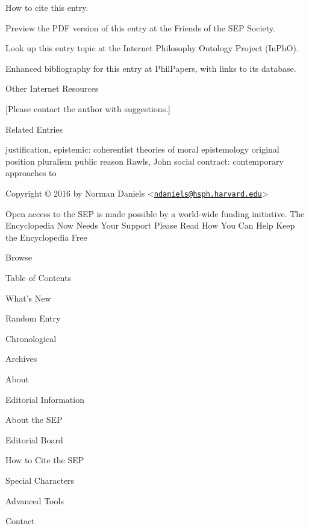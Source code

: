 \documentclass[]{article}
\begin{document}
How to cite this entry.

Preview the PDF version of this entry at the Friends of the SEP Society.

Look up this entry topic at the Internet Philosophy Ontology Project
(InPhO).

Enhanced bibliography for this entry at PhilPapers, with links to its
database.

\hypertarget{other-internet-resources}{}
\protect\hypertarget{Oth}{}{Other Internet Resources}

{[}Please contact the author with suggestions.{]}

\hypertarget{related-entries}{}
\protect\hypertarget{Rel}{}{Related Entries}

justification, epistemic: coherentist theories of \textbar{} moral
epistemology \textbar{} original position \textbar{} pluralism
\textbar{} public reason \textbar{} Rawls, John \textbar{} social
contract: contemporary approaches to

\hypertarget{article-copyright}{}
Copyright © 2016 by Norman Daniels
\textless{}\href{mailto:ndaniels@hsph.harvard.edu}{\nolinkurl{ndaniels@hsph.harvard.edu}}\textgreater{}

\hypertarget{article-banner}{}
\begin{scroll-block}

\leavevmode\hypertarget{article-banner-content}{}%
Open access to the SEP is made possible by a world-wide funding
initiative. The Encyclopedia Now Needs Your Support Please Read How You
Can Help Keep the Encyclopedia Free

\end{scroll-block}

\hypertarget{footer}{}
\hypertarget{footer-menu}{}
\begin{menu-block}

 Browse

Table of Contents

What's New

Random Entry

Chronological

Archives

\end{menu-block}

\begin{menu-block}

 About

Editorial Information

About the SEP

Editorial Board

How to Cite the SEP

Special Characters

Advanced Tools

Contact

\end{menu-block}
\end{document}
